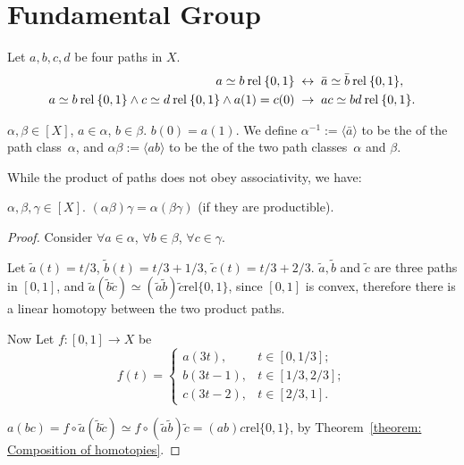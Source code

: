 \documentclass[openany, oneside, a5paper]{book}
\newcommand*{\rel}{\mathbin{\mathrm{rel}}}
\newcommand*{\pclass}[1]{\langle{#1}\rangle}    %
\begin{document}
\section{Fundamental Group}

\begin{theorem}
    Let $a, b, c, d$ be four paths in $X$.
    \begin{align*}
        a \simeq b \rel \{0, 1\} &\IFF \bar a \simeq \bar b \rel \{0, 1\}, \\
        a \simeq b \rel \{0, 1\} \wedge c \simeq d \rel \{0, 1\} \wedge a(1) = c(0) &\then ac \simeq bd \rel \{0, 1\}.
    \end{align*}
\end{theorem}

\begin{definition}
    $\alpha, \beta \in [X]$, $a \in \alpha$, $b \in \beta$.
    $b(0) = a(1)$.
    We define $\alpha^{-1} := \pclass{\bar a}$ to be the  of the path class~$\alpha$, and $\alpha \beta := \langle ab \rangle$ to be the  of the two path classes~$\alpha$ and $\beta$.
\end{definition}

While the product of paths does not obey associativity, we have:
\begin{theorem}%
    \label{theorem: Associativity of product of path classes}
    $\alpha, \beta, \gamma \in [X]$. $(\alpha \beta) \gamma = \alpha (\beta \gamma)$ (if they are productible).
\end{theorem}
\begin{proof}
    Consider $\forall a \in \alpha$, $\forall b \in \beta$, $\forall c \in \gamma$.

    Let $\tilde a(t) = t/3$, $\tilde b(t) = t/3 + 1/3$, $\tilde c(t) = t/3 + 2/3$. 
    $\tilde a, \tilde b$ and $\tilde c$ are three paths in $[0, 1]$, and $\tilde a (\tilde b \tilde c) \simeq (\tilde a \tilde b) \tilde c \rel \{0, 1\}$, since $[0, 1]$ is convex, therefore there is a linear homotopy between the two product paths.

    Now Let $f \colon [0, 1] \to X$ be
    \begin{equation*}
        f(t) = \begin{cases}
            a(3t), & t \in [0, 1/3]; \\
            b(3t - 1), & t \in [1/3, 2/3]; \\
            c(3t - 2), & t \in [2/3, 1].
        \end{cases}
    \end{equation*}

    $a(bc) = f \circ \tilde a (\tilde b \tilde c) \simeq f \circ (\tilde a \tilde b) \tilde c = (ab)c \rel \{0, 1\}$, by Theorem~\ref{theorem: Composition of homotopies}.
\end{proof}
\end{document}

